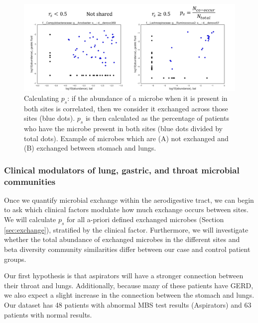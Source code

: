 \documentclass[12pt]{article}
\begin{document}
\begin{figure}
\begin{center}
    \includegraphics[scale=0.6]{sharedness_definition}
    \caption{Calculating $p_s$: if the abundance of a microbe when it is 
    present in both sites is correlated, then we consider it exchanged 
    across those sites (blue dots). $p_s$ is then calculated as the 
    percentage of patients who have the microbe present in both sites (blue 
    dots divided by total dots). Example of microbes which are (A) not 
    exchanged and (B) exchanged between stomach and lungs.}\label{fig:sharedness_defn}
\end{center}
\end{figure}


\subsubsection{Clinical modulators of lung, gastric, and throat microbial communities}
Once we quantify microbial exchange within the aerodigestive tract, we 
can begin to ask which clinical factors modulate how much exchange 
occurs between sites. We will calculate $p_s$ for all a-priori defined 
exchanged microbes (Section \ref{sec:exchange}), stratified by the 
clinical factor. Furthermore, we will investigate whether the total 
abundance of exchanged microbes in the different sites and beta 
diversity community similarities differ between our case and control 
patient groups.

Our first hypothesis is that aspirators will have a stronger 
connection between their throat and lungs. Additionally, because many 
of these patients have GERD, we also expect a slight increase in the 
connection between the stomach and lungs. Our dataset has 48 patients 
with abnormal MBS test results (Aspirators) and 63 patients with 
normal results.
\end{document}
